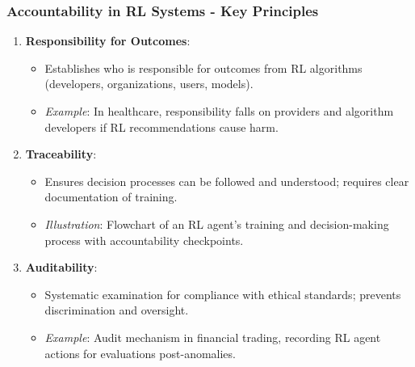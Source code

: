 \documentclass[aspectratio=169]{beamer}
\begin{document}
\begin{frame}[fragile]
    \frametitle{Accountability in RL Systems - Key Principles}
    \begin{enumerate}
        \item \textbf{Responsibility for Outcomes}:
        \begin{itemize}
            \item Establishes who is responsible for outcomes from RL algorithms (developers, organizations, users, models).
            \item \textit{Example}: In healthcare, responsibility falls on providers and algorithm developers if RL recommendations cause harm.
        \end{itemize}
        
        \item \textbf{Traceability}:
        \begin{itemize}
            \item Ensures decision processes can be followed and understood; requires clear documentation of training.
            \item \textit{Illustration}: Flowchart of an RL agent's training and decision-making process with accountability checkpoints.
        \end{itemize}
        
        \item \textbf{Auditability}:
        \begin{itemize}
            \item Systematic examination for compliance with ethical standards; prevents discrimination and oversight.
            \item \textit{Example}: Audit mechanism in financial trading, recording RL agent actions for evaluations post-anomalies.
        \end{itemize}
    \end{enumerate}
\end{frame}
\end{document}
